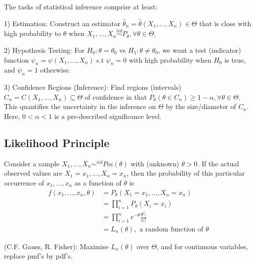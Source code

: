 \documentclass[a4paper]{article}
\begin{document}
The tasks of statistical inference comprise at least:

1) Estimation: Construct an estimator $\hat{\theta}_{n} = \hat{\theta}\left( X_{1}, \ldots, X_{n} \right) \in  \Theta $ that is close with high probability to $\theta$ when $X_{1}, \ldots, X_{n} \stackrel{iid}{\sim} P_{\theta}, \forall \theta \in  \Theta$.

2) Hypothesis Testing: For $H_0 : \theta = \theta_{0} $ vs $H_1 : \theta \neq \theta_{0} $, we want a test (indicator) function $\psi_{n} = \psi \left( X_{1}, \ldots, X_{n} \right) $ s.t $\psi _{n} = 0$ with high probability when $H_{0}$ is true, and $\psi_{n} = 1$ otherwise.

3) Confidence Regions (Inference): Find regions (intervals) $C_{n} = C \left( X_{1}, \ldots, X_{n} \right) \subseteq   \Theta $ of confidence in that $P_{\theta} \left( \theta \in  C_{n} \right) \ge 1 - \alpha, \forall \theta \in  \Theta$. This quantifies the uncertainty in the inference on $\Theta$ by the size/diameter of $C_{n}$. Here, $0 < \alpha < 1$ is a pre-described significance level.

\subsection{Likelihood Principle}

\begin{eg}
        Consider a sample $X_{1}, \ldots, X_{n} \sim ^{iid} Poi\left( \theta \right) $ with (unknown) $\theta > 0$. If the actual observed values are  $X_{1} = x_{1}, \ldots, X_{n} = x_{n}$, then the probability of this particular occurrence of $x_{1}, \ldots, x_{n}$ as a function of $\theta$ is 
\begin{align*}
	f \left( x_{1}, \ldots, x_{n}, \theta \right) &= P_{\theta} \left( X_{1}=x_{1}, \ldots, X_{n} = x_{n} \right) \\
						    &= \prod_{i=1}^{n} P_{\theta} \left( X_{i} = x_{i} \right) \\
						    &= \prod_{i=1}^{n} e^{-\theta} \frac{\theta^{x_{i}}}{x_{i}!} \\
						    &= L_{n}\left( \theta \right), \textrm{ a random function of } \theta 
\end{align*} 
\end{eg}

\begin{idea}
	(C.F. Gauss, R. Fisher): 
	Maximise $L_{n}\left( \theta \right)$ over $\Theta$, and for continuous variables, replace pmf's by pdf's.
\end{idea}
\end{document}

